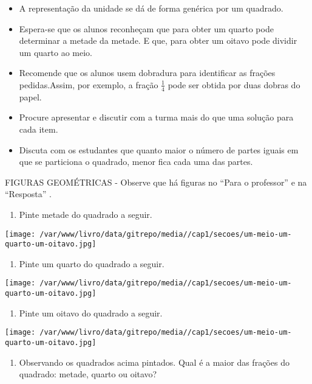 \documentclass[a4paper,12pt,twoside]{book}
\begin{document}
\begin{professor*}[breakable]{}{}
\begin{itemize} %
    \item       A representação da unidade se dá de forma genérica por um quadrado. 
    \item       Espera-se que os alunos reconheçam que para obter um quarto pode determinar a metade da metade. E que, para obter um oitavo pode dividir um quarto ao meio.
    \item       Recomende que os alunos usem dobradura para identificar as frações pedidas.Assim, por exemplo, a fração       $\frac{1}{4}$       pode ser obtida por duas dobras do papel.    
    \item       Procure apresentar e discutir com a turma mais do que uma solução para cada item.
    \item       Discuta com os estudantes que quanto maior o número de partes iguais em que se particiona o quadrado, menor fica cada uma das partes.
\end{itemize} %
  
\end{professor*}

\begin{imagem*}[breakable]{}{}   FIGURAS GEOMÉTRICAS - Observe que há figuras no   ``Para o professor''   e na   ``Resposta''  .  
\end{imagem*}

\begin{enumerate} [\quad a)] %
  \item     Pinte metade do quadrado a seguir.
\end{enumerate} %
\mbox{} \newline  \texttt{[image: /var/www/livro/data/gitrepo/media//cap1/secoes/um-meio-um-quarto-um-oitavo.jpg]}
\begin{enumerate} [\quad a)] %
  \item     Pinte um quarto do quadrado a seguir.
\end{enumerate} %
\mbox{} \newline  \texttt{[image: /var/www/livro/data/gitrepo/media//cap1/secoes/um-meio-um-quarto-um-oitavo.jpg]}
\begin{enumerate} [\quad a)] %
  \item     Pinte um oitavo do quadrado a seguir.
\end{enumerate} %
\mbox{} \newline  \texttt{[image: /var/www/livro/data/gitrepo/media//cap1/secoes/um-meio-um-quarto-um-oitavo.jpg]}
\begin{enumerate} [\quad a)] %
  \item     Observando os quadrados acima pintados. Qual é a maior das frações do quadrado: metade, quarto ou oitavo?
\end{enumerate} %
\end{document}

